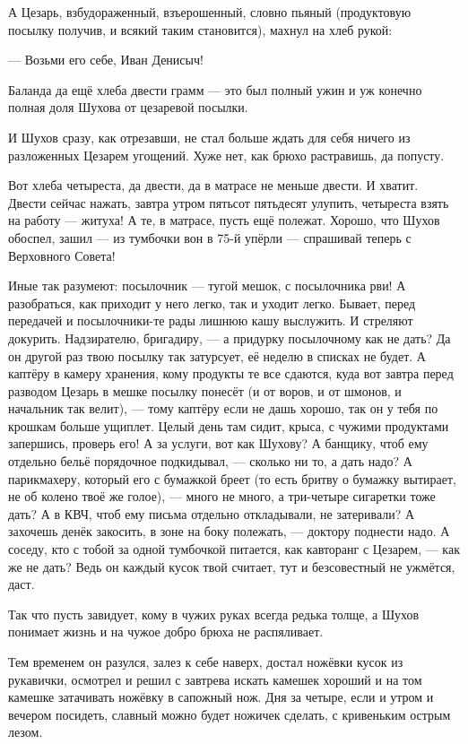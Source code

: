 А Цезарь, взбудораженный, взъерошенный, словно пьяный (продуктовую посылку получив, и всякий таким становится), махнул на хлеб рукой:

--- Возьми его себе, Иван Денисыч!

Баланда да ещё хлеба двести грамм --- это был полный ужин и уж конечно полная доля Шухова от цезаревой посылки.

И Шухов сразу, как отрезавши, не стал больше ждать для себя ничего из разложенных Цезарем угощений. Хуже нет, как брюхо растравишь, да попусту.

Вот хлеба четыреста, да двести, да в матрасе не меньше двести. И хватит. Двести сейчас нажать, завтра утром пятьсот пятьдесят улупить, четыреста взять на работу --- житуха! А те, в матрасе, пусть ещё полежат. Хорошо, что Шухов обоспел, зашил --- из тумбочки вон в 75-й упёрли --- спрашивай теперь с Верховного Совета!

Иные так разумеют: посылочник --- тугой мешок, с посылочника рви! А разобраться, как приходит у него легко, так и уходит легко. Бывает, перед передачей и посылочники-те рады лишнюю кашу выслужить. И стреляют докурить. Надзирателю, бригадиру, --- а придурку посылочному как не дать? Да он другой раз твою посылку так затурсует, её неделю в списках не будет. А каптёру в камеру хранения, кому продукты те все сдаются, куда вот завтра перед разводом Цезарь в мешке посылку понесёт (и от воров, и от шмонов, и начальник так велит), --- тому каптёру если не дашь хорошо, так он у тебя по крошкам больше ущиплет. Целый день там сидит, крыса, с чужими продуктами запершись, проверь его! А за услуги, вот как Шухову? А банщику, чтоб ему отдельно бельё порядочное подкидывал, --- сколько ни то, а дать надо? А парикмахеру, который его с бумажкой бреет (то есть бритву о бумажку вытирает, не об колено твоё же голое), --- много не много, а три-четыре сигаретки тоже дать? А в КВЧ, чтоб ему письма отдельно откладывали, не затеривали? А захочешь денёк закосить, в зоне на боку полежать, --- доктору поднести надо. А соседу, кто с тобой за одной тумбочкой питается, как кавторанг с Цезарем, --- как же не дать? Ведь он каждый кусок твой считает, тут и безсовестный не ужмётся, даст.

Так что пусть завидует, кому в чужих руках всегда редька толще, а Шухов понимает жизнь и на чужое добро брюха не распяливает.

Тем временем он разулся, залез к себе наверх, достал ножёвки кусок из рукавички, осмотрел и решил с завтрева искать камешек хороший и на том камешке затачивать ножёвку в сапожный нож. Дня за четыре, если и утром и вечером посидеть, славный можно будет ножичек сделать, с кривеньким острым лезом.

